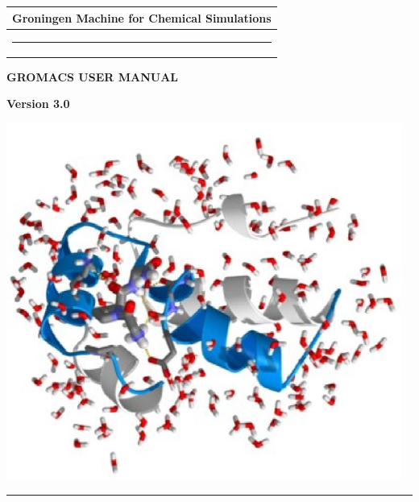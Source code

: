 \documentclass[11pt]{book}
\newcommand{\ntw}{13cm} %
\newcommand{\gmxver}{3.0}
\begin{document}
\sloppy
%
%
\thispagestyle{empty}
\begin{center}
{\Large
\begin{tabular}{c}
\hline
{\bf Groningen Machine for Chemical Simulations}\\
\hline
\rule{13cm}{0cm}\\
\end{tabular}
}

\vspace{0.5cm}

{\LARGE
{\bf GROMACS USER MANUAL}

\vspace{0.5cm}

{\bf Version \gmxver}
}

\vspace{1cm}


\vspace{1cm}

\includegraphics[width=\ntw]{plots/fp-nolabel}

\vspace{1ex}

\vspace{1cm}
\rule{13cm}{0.1mm}
\end{center}
\end{document}

